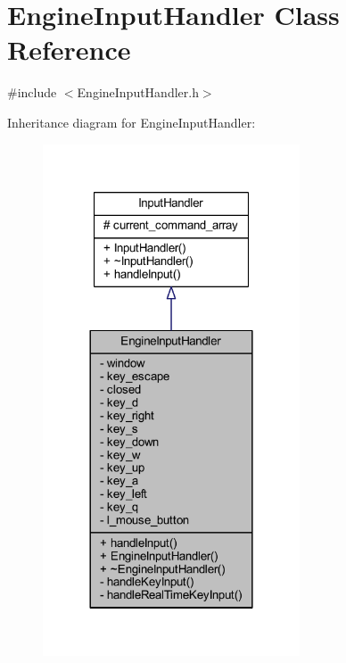 \hypertarget{class_engine_input_handler}{}\section{Engine\+Input\+Handler Class Reference}
\label{class_engine_input_handler}


{\ttfamily \#include $<$Engine\+Input\+Handler.\+h$>$}



Inheritance diagram for Engine\+Input\+Handler\+:\nopagebreak
\begin{figure}[H]
\begin{center}
\leavevmode
\includegraphics[width=216pt]{class_engine_input_handler__inherit__graph}
\end{center}
\end{figure}


